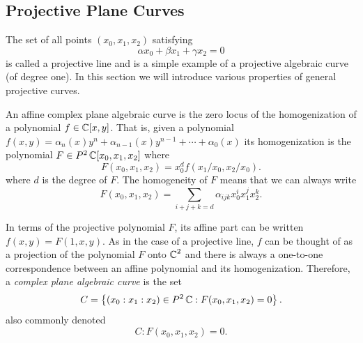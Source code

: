 \subsection{Projective Plane Curves}

The set of all points $(x_0, x_1, x_2)$ satisfying
\[
    \alpha x_0 + \beta x_1 + \gamma x_2 = 0
\]
is called a projective line and is a simple example of a projective
algebraic curve (of degree one). In this section we will introduce
various properties of general projective curves.

An affine complex plane algebraic curve is the zero locus of the
homogenization of a polynomial $f \in \operatorname{\mathbb{C}}[x,y]$. That is, given a
polynomial $f(x,y) = \alpha_n(x) y^n + \alpha_{n-1}(x)y^{n-1} + \cdots +
\alpha_0(x)$ its homogenization is the polynomial $F \in
P^2\operatorname{\mathbb{C}}[x_0,x_1,x_2]$ where
\[
    F(x_0,x_1,x_2) = x_0^d f(x_1/x_0,x_2/x_0).
\]
where $d$ is the degree of $F$. The homogeneity of $F$ means that we can
always write
\[
    F(x_0,x_1,x_2) = \sum_{i+j+k=d} \alpha_{ijk} x_0^i x_1^j x_2^k.
\]

In terms of the projective polynomial $F$, its affine part can be
written $f(x,y) = F(1,x,y)$. As in the case of a projective line, $f$
can be thought of as a projection of the polynomial $F$ onto $\operatorname{\mathbb{C}}^2$ and
there is always a one-to-one correspondence between an affine polynomial
and its homogenization. Therefore, a {\it complex plane algebraic curve}
is the set
\[
  C = \left\{
  (x_0 : x_1 : x_2) \in P^2\operatorname{\mathbb{C}} : F(x_0,x_1,x_2) = 0
  \right\}.
\]
also commonly denoted
\[
    C: F(x_0,x_1,x_2) = 0.
\]


